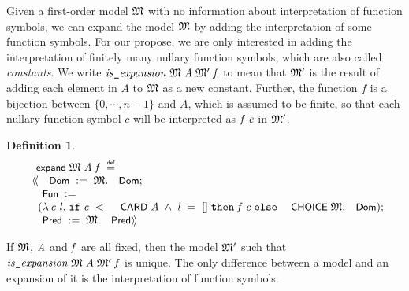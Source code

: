 \documentclass{llncs}
\newtheorem{defn}{Definition}[chapter]
\newenvironment{holmath}{\begin{displaymath}\begin{array}{l}}{\end{array}\end{displaymath}\ignorespacesafterend}
\renewcommand{\HOLConst}[1]{{\textsf{\upshape\small #1}}}
\renewcommand{\HOLinline}[1]{\ensuremath{#1}}
\renewcommand{\HOLFieldName}[1]{\HOLConst{#1}}
\renewcommand{\HOLTokenLeftrec}{\ensuremath{\langle\!\langle}}
\renewcommand{\HOLTokenRightrec}{\ensuremath{\rangle\!\rangle}}
\renewcommand{\HOLKeyword}[1]{\texttt{\upshape #1}}
\begin{document}
Given a first-order model \HOLinline{\HOLFreeVar{\ensuremath{\mathfrak{M}}}} with no information about interpretation of function symbols, we can expand the model \HOLinline{\HOLFreeVar{\ensuremath{\mathfrak{M}}}} by adding the interpretation of some function symbols. For our propose, we are only interested in adding the interpretation of finitely many nullary function symbols, which are also called \emph{constants}.  We write \HOLinline{\HOLFreeVar{is\HOLTokenUnderscore{}expansion}\;\HOLFreeVar{\ensuremath{\mathfrak{M}}}\;\HOLFreeVar{A}\;\HOLFreeVar{\ensuremath{\mathfrak{M}'}}\;\HOLFreeVar{f}} to mean that \HOLinline{\HOLFreeVar{\ensuremath{\mathfrak{M}'}}} is the result of adding each element in $A$ to \HOLinline{\HOLFreeVar{\ensuremath{\mathfrak{M}}}} as a new constant. Further, the function $f$ is a bijection between $\{0,\cdots,n-1\}$ and $A$, which is assumed to be finite, so that each nullary function symbol $c$ will be interpreted as \HOLinline{\HOLFreeVar{f}\;\HOLFreeVar{c}} in \HOLinline{\HOLFreeVar{\ensuremath{\mathfrak{M}'}}}.
\begin{defn}
{\upshape\cite[Definition A.9 (Expansion)]{Blackburn}}
\begin{holmath}
  \HOLConst{expand}\;\HOLFreeVar{\ensuremath{\mathfrak{M}}}\;\HOLFreeVar{A}\;\HOLFreeVar{f}\;\HOLTokenDefEquality{}\\
\;\;\HOLTokenLeftrec{}\HOLFieldName{Dom}\;:=\;\HOLFreeVar{\ensuremath{\mathfrak{M}}}.\HOLFieldName{Dom};\\
\;\;\HOLFieldName{Fun}\;:=\\
\;\;\;\;(\HOLTokenLambda{}\HOLBoundVar{c}\;\HOLBoundVar{l}.\;\HOLKeyword{if}\;\HOLBoundVar{c}\;\HOLSymConst{\HOLTokenLt{}}\;\HOLConst{CARD}\;\HOLFreeVar{A}\;\HOLSymConst{\HOLTokenConj{}}\;\HOLBoundVar{l}\;\HOLSymConst{=}\;[]\;\HOLKeyword{then}\;\HOLFreeVar{f}\;\HOLBoundVar{c}\;\HOLKeyword{else}\;\HOLConst{CHOICE}\;\HOLFreeVar{\ensuremath{\mathfrak{M}}}.\HOLFieldName{Dom});\\
\;\;\HOLFieldName{Pred}\;:=\;\HOLFreeVar{\ensuremath{\mathfrak{M}}}.\HOLFieldName{Pred}\HOLTokenRightrec{}
\end{holmath}
\end{defn}
If \HOLinline{\HOLFreeVar{\ensuremath{\mathfrak{M}}}}, \HOLinline{\HOLFreeVar{A}} and \HOLinline{\HOLFreeVar{f}} are all fixed, then the model \HOLinline{\HOLFreeVar{\ensuremath{\mathfrak{M}'}}} such that \HOLinline{\HOLFreeVar{is\HOLTokenUnderscore{}expansion}\;\HOLFreeVar{\ensuremath{\mathfrak{M}}}\;\HOLFreeVar{A}\;\HOLFreeVar{\ensuremath{\mathfrak{M}'}}\;\HOLFreeVar{f}} is unique. The only difference between a model and an expansion of it is the interpretation of function symbols. 
\end{document}
